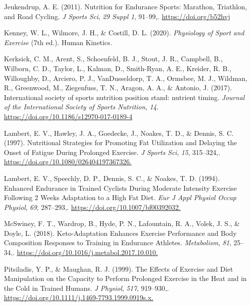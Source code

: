\documentclass[]{cik}%
\newlength{\cslhangindent}
\newlength{\cslentryspacingunit} %
\newenvironment{CSLReferences}[2] %
 {%
  \setlength{\parindent}{0pt}
  \ifodd #1
  \let\oldpar\par
  \def\par{\hangindent=\cslhangindent\oldpar}
  \fi
  \setlength{\parskip}{#2\cslentryspacingunit}
 }%
 {}
\begin{document}
\begin{CSLReferences}{1}{0}
\leavevmode{}%
Jeukendrup, A. E. (2011). Nutrition for Endurance Sports: Marathon,
Triathlon, and Road Cycling. \emph{J Sports Sci}, \emph{29 Suppl 1},
91--99,. \url{https://doi.org/b52hvj}

\leavevmode{}%
Kenney, W. L., Wilmore, J. H., \& Costill, D. L. (2020).
\emph{Physiology of Sport and Exercise} (7th ed.). Human Kinetics.

\leavevmode{}%
Kerksick, C. M., Arent, S., Schoenfeld, B. J., Stout, J. R., Campbell,
B., Wilborn, C. D., Taylor, L., Kalman, D., Smith-Ryan, A. E., Kreider,
R. B., Willoughby, D., Arciero, P. J., VanDusseldorp, T. A., Ormsbee, M.
J., Wildman, R., Greenwood, M., Ziegenfuss, T. N., Aragon, A. A., \&
Antonio, J. (2017). International society of sports nutrition position
stand: nutrient timing. \emph{Journal of the International Society of
Sports Nutrition}, \emph{14}.
\url{https://doi.org/10.1186/s12970-017-0189-4}

\leavevmode{}%
Lambert, E. V., Hawley, J. A., Goedecke, J., Noakes, T. D., \& Dennis,
S. C. (1997). Nutritional Strategies for Promoting Fat Utilization and
Delaying the Onset of Fatigue During Prolonged Exercise. \emph{J Sports
Sci}, \emph{15}, 315--324,.
\url{https://doi.org/10.1080/026404197367326.}

\leavevmode{}%
Lambert, E. V., Speechly, D. P., Dennis, S. C., \& Noakes, T. D. (1994).
Enhanced Endurance in Trained Cyclists During Moderate Intensity
Exercise Following 2 Weeks Adaptation to a High Fat Diet. \emph{Eur J
Appl Physiol Occup Physiol}, \emph{69}, 287--293,.
\url{https://doi.org/10.1007/bf00392032.}

\leavevmode{}%
McSwiney, F. T., Wardrop, B., Hyde, P. N., Lafountain, R. A., Volek, J.
S., \& Doyle, L. (2018). Keto-Adaptation Enhances Exercise Performance
and Body Composition Responses to Training in Endurance Athletes.
\emph{Metabolism}, \emph{81}, 25--34,.
\url{https://doi.org/10.1016/j.metabol.2017.10.010.}

\leavevmode{}%
Pitsiladis, Y. P., \& Maughan, R. J. (1999). The Effects of Exercise and
Diet Manipulation on the Capacity to Perform Prolonged Exercise in the
Heat and in the Cold in Trained Humans. \emph{J Physiol}, \emph{517},
919--930,. \url{https://doi.org/10.1111/j.1469-7793.1999.0919s.x.}


\end{CSLReferences}
\end{document}
